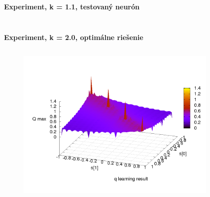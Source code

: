 \documentclass[xcolor=dvipsnames]{beamer}
\begin{document}
\begin{frame}{\bf Experiment, k = 1.1, testovaný neurón}
\begin{columns}
\begin{column}{0.5\textwidth}
\begin{figure}[ht]
        \end{figure}

	\end{column}
\end{columns}

\end{frame}










\begin{frame}{\bf Experiment, k = 2.0, optimálne riešenie}

\begin{columns}
	\begin{column}{0.5\textwidth}

        \begin{figure}[ht]

        \begin{center}
        \includegraphics[width=1.0\textwidth]{experiment_02/table/q_map.png}
        \end{center}

        \end{figure}

	\end{column}
	\begin{column}{0.5\textwidth}

        \begin{figure}[ht]


\end{figure}
\end{column}
\end{columns}
\end{frame}
\end{document}
